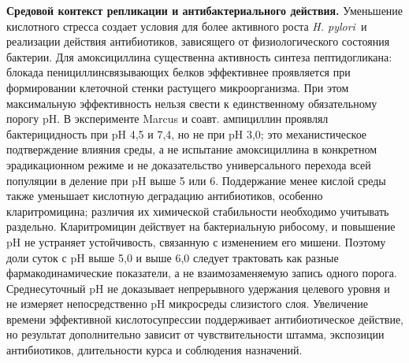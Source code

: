 \documentclass[11pt,a4paper,notitlepage]{report}
\newcommand{\Hp}{\textit{H. pylori}}
\newcommand{\src}[1]{\unskip\space\cite{#1}}
\begin{document}
\textbf{Средовой контекст репликации и антибактериального действия.} Уменьшение кислотного стресса создает условия для более активного роста \Hp\ и реализации действия антибиотиков, зависящего от физиологического состояния бактерии. Для амоксициллина существенна активность синтеза пептидогликана: блокада пенициллинсвязывающих белков эффективнее проявляется при формировании клеточной стенки растущего микроорганизма. При этом максимальную эффективность нельзя свести к единственному обязательному порогу pH. В эксперименте Marcus и соавт. ампициллин проявлял бактерицидность при pH 4,5 и 7,4, но не при pH 3,0; это механистическое подтверждение влияния среды, а не испытание амоксициллина в конкретном эрадикационном режиме и не доказательство универсального перехода всей популяции в деление при pH выше 5 или 6.\src{hpgrowth2012} Поддержание менее кислой среды также уменьшает кислотную деградацию антибиотиков, особенно кларитромицина; различия их химической стабильности необходимо учитывать раздельно. Кларитромицин действует на бактериальную рибосому, и повышение pH не устраняет устойчивость, связанную с изменением его мишени.\src{hpstability1997,acghp} Поэтому доли суток с pH выше 5,0 и выше 6,0 следует трактовать как разные фармакодинамические показатели, а не взаимозаменяемую запись одного порога. Среднесуточный pH не доказывает непрерывного удержания целевого уровня и не измеряет непосредственно pH микросреды слизистого слоя. Увеличение времени эффективной кислотосупрессии поддерживает антибиотическое действие, но результат дополнительно зависит от чувствительности штамма, экспозиции антибиотиков, длительности курса и соблюдения назначений.\src{hpphblum1998,hpphfuruta2001,hpgrowth2012,acghp}
\end{document}
